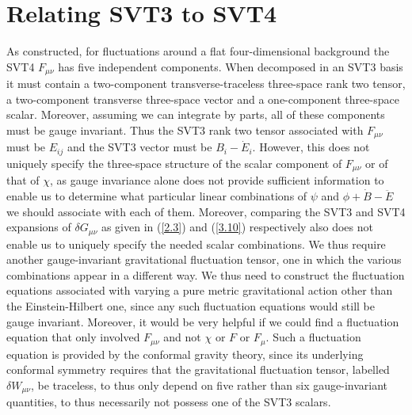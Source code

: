 \section{Relating SVT3 to SVT4}
\label{s:relating_svt3_to_svt4}



As constructed, for fluctuations around a flat four-dimensional background the SVT4 $F_{\mu\nu}$ has five independent components. When decomposed in an SVT3 basis it must contain a two-component transverse-traceless three-space rank two tensor, a two-component transverse three-space vector and a one-component three-space scalar. Moreover, assuming we can integrate by parts, all of these components must be gauge invariant. Thus the SVT3 rank two tensor associated with $F_{\mu\nu}$ must be $E_{ij}$ and the SVT3 vector must be  $B_i-\dot{E}_i$. However, this does not uniquely specify the three-space structure of the scalar component of $F_{\mu\nu}$ or of that of $\chi$, as gauge invariance alone does not provide sufficient information to enable us to determine what particular linear combinations of  $\psi$ and  $\phi+\dot{B}-\ddot{E}$ we should associate with each of them. Moreover, comparing the SVT3 and SVT4 expansions of $\delta G_{\mu\nu}$ as given in (\ref{2.3}) and (\ref{3.10}) respectively also does not enable us to uniquely specify the needed scalar combinations. We thus require another gauge-invariant gravitational fluctuation tensor, one in which the various combinations appear in a different way. We thus need to construct the fluctuation equations associated with varying a pure metric gravitational action other than the Einstein-Hilbert one, since any such fluctuation equations would still be gauge invariant. Moreover, it would be very helpful if we could find a fluctuation equation that only involved $F_{\mu\nu}$ and not $\chi$ or $F$ or $F_{\mu}$. Such a fluctuation equation is provided by the conformal gravity theory, since its underlying conformal symmetry requires that the gravitational fluctuation tensor,  labelled $\delta W_{\mu\nu}$, be traceless, to thus only depend on five rather than six gauge-invariant quantities, to thus necessarily not possess one of the SVT3 scalars.


